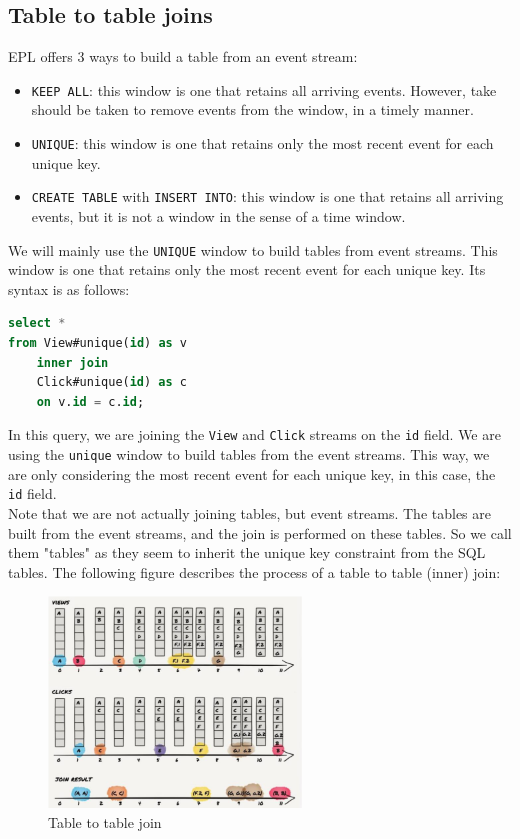 \subsection{Table to table joins}

EPL offers 3 ways to build a table from an event stream:

\begin{itemize}
    \item \texttt{KEEP ALL}: this window is one that retains all arriving events. However,
    take should be taken to remove events from the window, in a timely manner.
    \item \texttt{UNIQUE}: this window is one that retains only the most recent event for
    each unique key. 
    \item \texttt{CREATE TABLE} with \texttt{INSERT INTO}: this window is one that retains
    all arriving events, but it is not a window in the sense of a time window.
\end{itemize}

We will mainly use the \texttt{UNIQUE} window to build tables from event streams. This
window is one that retains only the most recent event for each unique key. Its syntax is
as follows:\\

\begin{lstlisting}[language=SQL]
select *
from View#unique(id) as v
    inner join
    Click#unique(id) as c
    on v.id = c.id;
\end{lstlisting}

In this query, we are joining the \texttt{View} and \texttt{Click} streams on the
\texttt{id} field. We are using the \texttt{unique} window to build tables from the
event streams. This way, we are only considering the most recent event for each unique
key, in this case, the \texttt{id} field.\\

Note that we are not actually joining tables, but event streams. The tables are built
from the event streams, and the join is performed on these tables. So we call them 
"tables" as they seem to inherit the unique key constraint from the SQL tables. The
following figure describes the process of a table to table (inner) join:

\begin{figure}[H]
    \centering
    \includegraphics[width=0.6\textwidth]{figures/image_table_table_join.png}
    \caption{Table to table join}
    \label{fig:table_table_join}
\end{figure}


